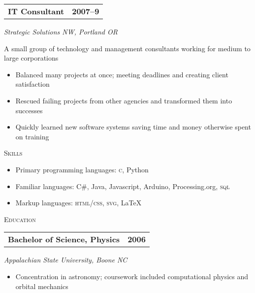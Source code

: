 \documentclass[letterpaper,10pt]{article}
\makeatletter
\newcommand{\resumeheader}[1]{
  \vspace{0.08in}
  \textsc{\Large #1}
  \vspace{0.10in}
}
\newcommand{\resumeitem}[4]{
  {\addtolength{\leftskip}{0.21in}
    \begin{tabular*}{6.25in}{l@{\extracolsep{\fill}} r}
      {\textbf{#1}} & {\textbf{#2}} \\
    \end{tabular*}
    
  }
  
  \vspace{0.01in}
  {\addtolength{\leftskip}{0.3in}
    \textit{#3}\par
  }
  
  \vspace{0.07in}
  {\addtolength{\leftskip}{0.3in}
    \small
    \begin{minipage}{5in}
      #4
    \end{minipage}
    
  }
  \vspace{0.15in}
}
\makeatother
\begin{document}
\resumeitem{IT Consultant}{2007--9}%
           {Strategic Solutions NW, Portland OR}%
           {
              A small group of technology and management consultants working for medium to large corporations
              \begin{itemize}[topsep=1pt, itemsep=0pt, parsep=0pt]
                \renewcommand{\labelitemi}{---}
                \item Balanced many projects at once; meeting deadlines and creating client satisfaction
                \item Rescued failing projects from other agencies and transformed them into successes
                \item Quickly learned new software systems saving time and money otherwise spent on training
              \end{itemize}
           }
           
\resumeheader{Skills} 

\begin{itemize}[topsep=1pt, itemsep=0pt, parsep=0pt]
  \renewcommand{\labelitemi}{---}
  \item Primary programming languages: \textsc{c}, Python
  \item Familiar languages: C\#, Java, Javascript, Arduino, Processing.org, \textsc{sql}
  \item Markup languages: \textsc{html}/\textsc{css}, \textsc{svg}, \LaTeX
\end{itemize}

\resumeheader{Education}

\resumeitem{Bachelor of Science, Physics} {2006}%
           {Appalachian State University, Boone NC}%
           {
              \begin{itemize}[topsep=1pt, itemsep=0pt, parsep=0pt]
                \renewcommand{\labelitemi}{---}
                \item Concentration in astronomy; coursework included computational physics and orbital mechanics
              \end{itemize}
           }
              
\end{document}

